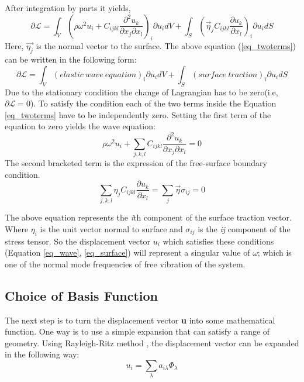 \begin{doublespacing}
After integration by parts it yields,
\begin{equation}
\label{eq_twoterms}
\partial{\mathcal{L}} = \int_V \left(\rho \omega^2 u_i + C_{ijkl} \frac {\partial^2{u_k}}{\partial{x_j}\partial{x_l}} \right )_i \partial{u_i} dV + \int_S \left (\vec{\eta}_j C_{ijkl}\frac{\partial{u_k}}{\partial{x_l}} \right)_i \partial{u_i} dS
\end{equation}
Here, $\vec{\eta_j}$ is the normal vector to the surface. The above equation (\ref{eq_twoterms}) can be written in the following form:
\begin{equation}
\partial{\mathcal{L}} = \int_V (elastic\ wave\ equation)_i \partial{u_i} dV + \int_S (surface\  traction)_i \partial{u_i} dS
\end{equation}
Due to the stationary condition the change of Lagrangian has to be zero(i.e, $\partial{\mathcal{L}}=0$). To satisfy the condition each of the two terms inside the Equation \ref{eq_twoterms} have to be independently zero. Setting the first term of the equation to zero yields the wave equation:
\begin{equation}
\label{eq_wave}
\rho \omega^2 u_i + \sum_{j,k,l}C_{ijkl} \frac{\partial^2{u_k}}{\partial{x_j}\partial{x_l}} = 0
\end{equation}
The second bracketed term is the expression of the free-surface boundary condition.
\begin{equation}
\label{eq_surface}
\sum_{j,k,l}\eta_j C_{ijkl}\frac{\partial{u_k}}{\partial{x_l}} = \sum_j\vec{\eta} \sigma_{ij}= 0
\end{equation}


The above equation represents the \textit{i}th component of the surface traction vector. Where $\eta_i$ is the unit vector normal to surface and $\sigma_{ij}$ is the \textit{ij} component of the stress tensor. So the displacement vector $u_i$ which satisfies these conditions (Equation \ref{eq_wave}, \ref{eq_surface}) will represent a singular value of $\omega$; which is one of the normal mode frequencies of free vibration of the system.

\subsection{Choice of Basis Function}
The next step is to turn the displacement vector \textbf{u} into some mathematical function. One way is to use a simple expansion that can satisfy a range of geometry. Using Rayleigh-Ritz method \cite{preumont2013twelve}, the displacement vector can be expanded in the following way:
\begin{equation}
\label{eq_rritz}
u_i = \sum_{\lambda} a_{i\lambda} \Phi_\lambda
\end{equation}



\end{doublespacing}
